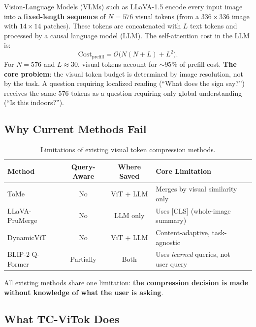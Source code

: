 \documentclass[11pt,a4paper]{article}
\begin{document}
\begin{definitionbox}[title={The Fixed-Budget Problem}]
Vision-Language Models (VLMs) such as LLaVA-1.5 encode every input image
into a \textbf{fixed-length sequence} of $N = 576$ visual tokens (from a
$336 \times 336$ image with $14 \times 14$ patches). These tokens are
concatenated with $L$ text tokens and processed by a causal language model
(LLM). The self-attention cost in the LLM is:
\begin{equation}
  \text{Cost}_{\text{prefill}} = \mathcal{O}\bigl(N(N + L) + L^2\bigr).
  \label{eq:prefill_cost}
\end{equation}
For $N = 576$ and $L \approx 30$, visual tokens account for
$\sim\!95\%$ of prefill cost. \textbf{The core problem}: the visual token
budget is determined by image resolution, not by the task. A question
requiring localized reading (``What does the sign say?'') receives the
same 576 tokens as a question requiring only global understanding
(``Is this indoors?'').
\end{definitionbox}

\subsection{Why Current Methods Fail}

\begin{table}[h]
\centering
\caption{Limitations of existing visual token compression methods.}
\label{tab:existing_methods}
\renewcommand{\arraystretch}{1.2}
\small
\begin{tabular}{@{}lccll@{}}
  \toprule
  Method & Query-Aware & Where Saved & Core Limitation \\
  \midrule
  ToMe & No & ViT + LLM & Merges by visual similarity only \\
  LLaVA-PruMerge & No & LLM only & Uses {[CLS]} (whole-image summary) \\
  DynamicViT & No & ViT + LLM & Content-adaptive, task-agnostic \\
  BLIP-2 Q-Former & Partially & Both & Uses \emph{learned} queries, not user query \\
  \bottomrule
\end{tabular}
\end{table}

All existing methods share one limitation: \textbf{the compression decision
is made without knowledge of what the user is asking}.

\subsection{What TC-ViTok Does}
\end{document}
